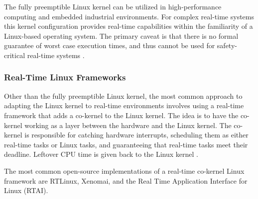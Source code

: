                 The fully preemptible Linux kernel can be utilized in
                    high-performance computing and embedded industrial
                    environments.
                For complex real-time systems this kernel configuration provides
                    real-time capabilities within the familiarity of a
                    Linux-based operating system.
                The primary caveat is that there is no formal guarantee of worst
                    case execution times, and thus cannot be used for
                    safety-critical real-time systems \cite{preempt-rt-survey}.

            \markboth{}{}
            \subsubsection{Real-Time Linux Frameworks}
            \markboth{}{}
                Other than the fully preemptible Linux kernel, the most common
                    approach to adapting the Linux kernel to real-time
                    environments involves using a real-time framework that adds
                    a co-kernel to the Linux kernel.
                The idea is to have the co-kernel working as a layer between the
                    hardware and the Linux kernel.
                The co-kernel is responsible for catching hardware interrupts,
                    scheduling them as either real-time tasks or Linux tasks,
                    and guaranteeing that real-time tasks meet their deadline.
                Leftover CPU time is given back to the Linux kernel
                    \cite{preempt-rt-survey}.

                The most common open-source implementations of a real-time
                    co-kernel Linux framework are RTLinux, Xenomai, and the Real
                    Time Application Interface for Linux (RTAI).

